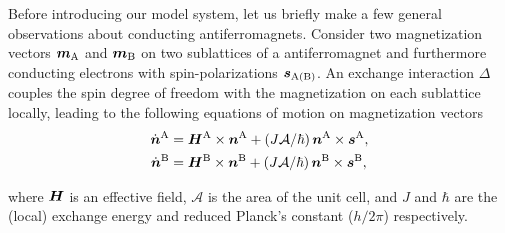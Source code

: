 Before introducing our model system, let us briefly make a few general observations about conducting antiferromagnets. Consider two magnetization vectors $\boldsymbol{m}_\text{A}$ and $\boldsymbol{m}_\text{B}$ on two sublattices of a antiferromagnet and furthermore conducting electrons with spin-polarizations $\boldsymbol{s}_\text{A(B)}$. An exchange interaction $\Delta$ couples the spin degree of freedom with the magnetization on each sublattice locally, leading to the following equations of motion on magnetization vectors
\beml
\label{basicEQ}
\begin{align}
\dot{\boldsymbol{n}}^\textrm{A} &= \boldsymbol{H}^\textrm{A}\times\boldsymbol{n}^\textrm{A}  + (J\mathcal{A}/\hbar)\,\boldsymbol{n}^\textrm{A}\times \boldsymbol{s}^\textrm{A},\\
\dot{\boldsymbol{n}}^\textrm{B}&= \boldsymbol{H}^\textrm{B}\times\boldsymbol{n}^\textrm{B} +(J\mathcal{A}/\hbar)\,\boldsymbol{n}^\textrm{B}\times \boldsymbol{s}^\textrm{B},
\end{align}

where $\boldsymbol{H}$ is an effective field, $\mathcal{A}$ is the area of the unit cell, and $J$ and $\hbar$ are the (local) exchange energy and reduced Planck's constant ($h/2\pi$) respectively. 

